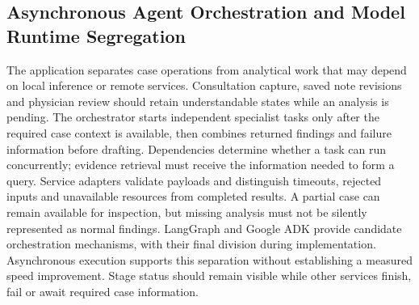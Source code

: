 \subsection{Asynchronous Agent Orchestration and Model Runtime Segregation}

The application separates case operations from analytical work that may depend on local inference or remote services. Consultation capture, saved note revisions and physician review should retain understandable states while an analysis is pending. The orchestrator starts independent specialist tasks only after the required case context is available, then combines returned findings and failure information before drafting. Dependencies determine whether a task can run concurrently; evidence retrieval must receive the information needed to form a query. Service adapters validate payloads and distinguish timeouts, rejected inputs and unavailable resources from completed results. A partial case can remain available for inspection, but missing analysis must not be silently represented as normal findings. LangGraph and Google ADK provide candidate orchestration mechanisms, with their final division during implementation. Asynchronous execution supports this separation without establishing a measured speed improvement. Stage status should remain visible while other services finish, fail or await required case information.

